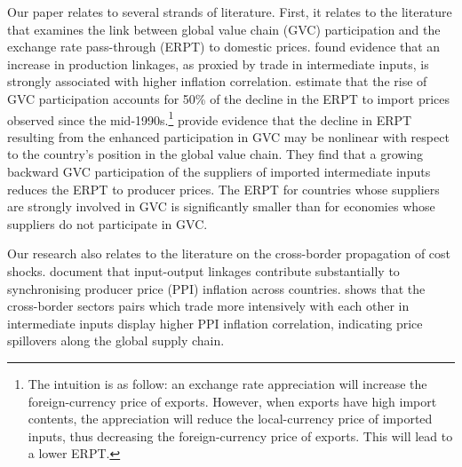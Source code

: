 \documentclass[11pt,a4paper]{article}
\begin{document}
Our paper relates to several strands of literature.
First, it relates to the literature that examines the link between global value chain (GVC) participation and the exchange rate pass-through (ERPT) to domestic prices. \cite{DeSoyres2018} found evidence that an increase in production linkages, as proxied by trade in intermediate inputs, is strongly associated with higher inflation correlation. 
\cite{Georgiadis2019} estimate that the rise of GVC participation accounts for 50\% of the decline in the ERPT to import prices observed since the mid-1990s.\footnote{The intuition is as follow: an exchange rate appreciation will increase the foreign-currency price of exports. However, when exports have high import contents, the appreciation will reduce the local-currency price of imported inputs, thus decreasing the foreign-currency price of exports. This will lead to a lower ERPT. }
\cite{Hagemejer2020} provide evidence that the decline in ERPT resulting from the enhanced participation in GVC may be nonlinear with respect to the country's position in the global value chain.
They find that a growing backward GVC participation of the suppliers of imported intermediate inputs reduces the ERPT to producer prices. 
The ERPT for countries whose suppliers are strongly involved in GVC is significantly smaller than for economies whose suppliers do not participate in GVC. 

Our research also relates to the literature on the cross-border propagation of cost shocks. 
\cite{Auer2019} document that input-output linkages contribute substantially to synchronising producer price (PPI) inflation across countries. %
\cite{AntoundeAlmeida2016} shows that the cross-border sectors pairs which trade more intensively with each other in intermediate inputs display higher PPI inflation correlation, indicating  price spillovers along the global supply chain. 
\end{document}
